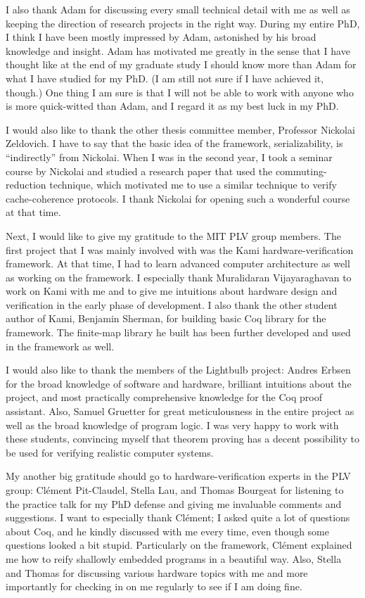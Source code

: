 I also thank Adam for discussing every small technical detail with me as well as keeping the direction of research projects in the right way.
During my entire PhD, I think I have been mostly impressed by Adam, astonished by his broad knowledge and insight.
Adam has motivated me greatly in the sense that I have thought like at the end of my graduate study I should know more than Adam for what I have studied for my PhD.
(I am still not sure if I have achieved it, though.)
One thing I am sure is that I will not be able to work with anyone who is more quick-witted than Adam, and I regard it as my best luck in my PhD.

I would also like to thank the other thesis committee member, Professor Nickolai Zeldovich.
I have to say that the basic idea of the \hemiola{} framework, serializability, is ``indirectly'' from Nickolai.
When I was in the second year, I took a seminar course by Nickolai and studied a research paper that used the commuting-reduction technique, which motivated me to use a similar technique to verify cache-coherence protocols.
I thank Nickolai for opening such a wonderful course at that time.

Next, I would like to give my gratitude to the MIT PLV group members.
The first project that I was mainly involved with was the Kami hardware-verification framework.
At that time, I had to learn advanced computer architecture as well as working on the framework.
I especially thank Muralidaran Vijayaraghavan to work on Kami with me and to give me intuitions about hardware design and verification in the early phase of development.
I also thank the other student author of Kami, Benjamin Sherman, for building basic Coq library for the framework.
The finite-map library he built has been further developed and used in the \hemiola{} framework as well.

I would also like to thank the members of the Lightbulb project: Andres Erbsen for the broad knowledge of software and hardware, brilliant intuitions about the project, and most practically comprehensive knowledge for the Coq proof assistant.
Also, Samuel Gruetter for great meticulousness in the entire project as well as the broad knowledge of program logic.
I was very happy to work with these students, convincing myself that theorem proving has a decent possibility to be used for verifying realistic computer systems.

My another big gratitude should go to hardware-verification experts in the PLV group: Cl\'ement Pit-Claudel, Stella Lau, and Thomas Bourgeat for listening to the practice talk for my PhD defense and giving me invaluable comments and suggestions.
I want to especially thank Cl\'ement; I asked quite a lot of questions about Coq, and he kindly discussed with me every time, even though some questions looked a bit stupid.
Particularly on the \hemiola{} framework, Cl\'ement explained me how to reify shallowly embedded programs in a beautiful way.
Also, Stella and Thomas for discussing various hardware topics with me and more importantly for checking in on me regularly to see if I am doing fine.

